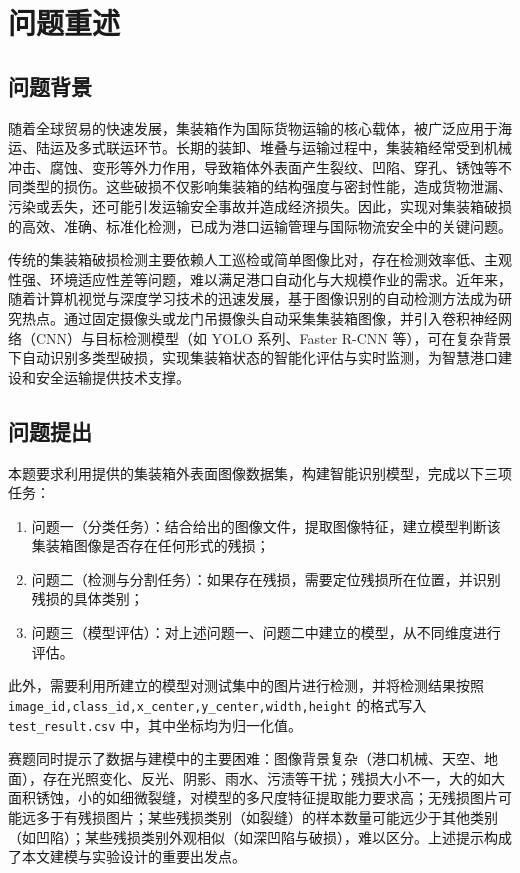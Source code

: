 \section{问题重述}

\subsection{问题背景}

随着全球贸易的快速发展，集装箱作为国际货物运输的核心载体，被广泛应用于海运、陆运及多式联运环节。长期的装卸、堆叠与运输过程中，集装箱经常受到机械冲击、腐蚀、变形等外力作用，导致箱体外表面产生裂纹、凹陷、穿孔、锈蚀等不同类型的损伤。这些破损不仅影响集装箱的结构强度与密封性能，造成货物泄漏、污染或丢失，还可能引发运输安全事故并造成经济损失。因此，实现对集装箱破损的高效、准确、标准化检测，已成为港口运输管理与国际物流安全中的关键问题。

传统的集装箱破损检测主要依赖人工巡检或简单图像比对，存在检测效率低、主观性强、环境适应性差等问题，难以满足港口自动化与大规模作业的需求。近年来，随着计算机视觉与深度学习技术的迅速发展，基于图像识别的自动检测方法成为研究热点。通过固定摄像头或龙门吊摄像头自动采集集装箱图像，并引入卷积神经网络（CNN\cite{he2016resnet}）与目标检测模型（如 YOLO 系列\cite{redmon2016,redmon2018,bochkovskiy2020,jocher2023}、Faster R-CNN\cite{ren2015} 等），可在复杂背景下自动识别多类型破损，实现集装箱状态的智能化评估与实时监测，为智慧港口建设和安全运输提供技术支撑。

\subsection{问题提出}

本题要求利用提供的集装箱外表面图像数据集，构建智能识别模型，完成以下三项任务：

\begin{enumerate}[leftmargin=2.2em,itemsep=2pt]
  \item {\heiti 问题一（分类任务）：}结合给出的图像文件，提取图像特征，建立模型判断该集装箱图像是否存在任何形式的残损；
  \item {\heiti 问题二（检测与分割任务）：}如果存在残损，需要定位残损所在位置，并识别残损的具体类别；
  \item {\heiti 问题三（模型评估）：}对上述问题一、问题二中建立的模型，从不同维度进行评估。
\end{enumerate}

此外，需要利用所建立的模型对测试集中的图片进行检测，并将检测结果按照 \texttt{image\_id,\allowbreak class\_id,\allowbreak x\_center,\allowbreak y\_center,\allowbreak width,\allowbreak height} 的格式写入 \texttt{test\_result.csv} 中，其中坐标均为归一化值。

赛题同时提示了数据与建模中的主要困难：图像背景复杂（港口机械、天空、地面），存在光照变化、反光、阴影、雨水、污渍等干扰；残损大小不一，大的如大面积锈蚀，小的如细微裂缝，对模型的多尺度特征提取能力要求高；无残损图片可能远多于有残损图片；某些残损类别（如裂缝）的样本数量可能远少于其他类别（如凹陷）；某些残损类别外观相似（如深凹陷与破损），难以区分。上述提示构成了本文建模与实验设计的重要出发点。

